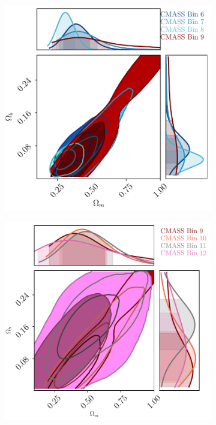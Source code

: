 \begin{figure}
\begin{subfigure}{.5\textwidth}
  \caption{}
\end{subfigure}\\
\begin{subfigure}{.5\textwidth}
  \centering
  \includegraphics[width=\columnwidth]{BOSS-FIGS/CMASS_SINGLE_BIN_1.pdf}
  \caption{}
\end{subfigure}%
\begin{subfigure}{.5\textwidth}
  \centering
  \includegraphics[width=\columnwidth]{BOSS-FIGS/CMASS_SINGLE_BIN_2.pdf}

\end{subfigure}
\end{figure}
